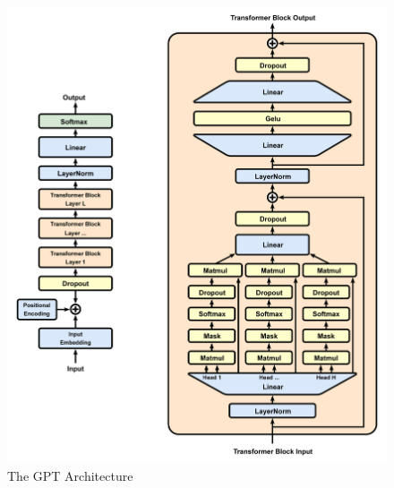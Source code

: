 \begin{figure}
	\centering
	\includegraphics[width=1.0\linewidth]{figures/Full_GPT_architecture}
	\caption[Transformer Architecture]{The GPT Architecture~\cite{brown2020_language}}
	\label{fig:GPT_Architecture}
\end{figure}

